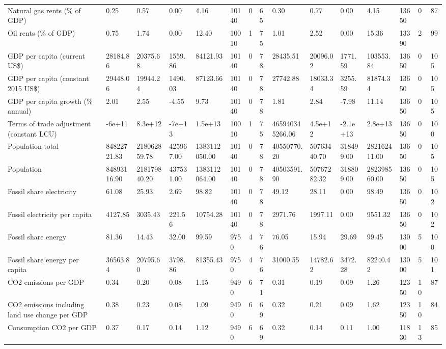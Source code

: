 \begin{longtable}{lllllllllllllll}
\addlinespace
Natural gas rents (\% of GDP) & 0.25 & 0.57 & 0.00 & 4.16 & 10140 & 0 & 65 & 0.30 & 0.77 & 0.00 & 4.15 & 13650 & 0 & 87\\
Oil rents (\% of GDP) & 0.75 & 1.74 & 0.00 & 12.40 & 10010 & 1 & 75 & 1.01 & 2.52 & 0.00 & 15.36 & 13390 & 2 & 99\\
GDP per capita (current US\$) & 28184.86 & 20375.68 & 1559.86 & 84121.93 & 10140 & 0 & 78 & 28435.51 & 20096.02 & 1771.59 & 103553.84 & 13650 & 0 & 105\\
GDP per capita (constant 2015 US\$) & 29448.06 & 19944.24 & 1490.03 & 87123.66 & 10140 & 0 & 78 & 27742.88 & 18033.34 & 3255.59 & 81874.34 & 13650 & 0 & 105\\
GDP per capita growth (\% annual) & 2.01 & 2.55 & -4.55 & 9.73 & 10140 & 0 & 78 & 1.81 & 2.84 & -7.98 & 11.14 & 13650 & 0 & 105\\
\addlinespace
Terms of trade adjustment (constant LCU) & -6e+11 & 8.3e+12 & -7e+13 & 1.5e+13 & 10010 & 1 & 75 & 465940345266.06 & 4.5e+12 & -2.1e+13 & 2.8e+13 & 13650 & 0 & 100\\
Population total & 84822721.83 & 218062859.78 & 425967.00 & 1383112050.00 & 10140 & 0 & 78 & 40550770.20 & 50763440.70 & 318499.00 & 282162411.00 & 13650 & 0 & 105\\
Population & 84893116.90 & 218179840.20 & 437531.00 & 1383112064.00 & 10140 & 0 & 78 & 40503591.90 & 50767282.32 & 318809.00 & 282398560.00 & 13650 & 0 & 105\\
Fossil share electricity & 61.08 & 25.93 & 2.69 & 98.82 & 10140 & 0 & 78 & 49.12 & 28.11 & 0.00 & 98.49 & 13650 & 0 & 102\\
Fossil electricity per capita & 4127.85 & 3035.43 & 221.56 & 10754.28 & 10140 & 0 & 78 & 2971.76 & 1997.11 & 0.00 & 9551.32 & 13650 & 0 & 102\\
\addlinespace
Fossil share energy & 81.36 & 14.43 & 32.00 & 99.59 & 9750 & 4 & 76 & 76.05 & 15.94 & 29.69 & 99.45 & 13000 & 5 & 100\\
Fossil share energy per capita & 36563.84 & 20795.60 & 3798.86 & 81355.43 & 9750 & 4 & 76 & 31000.55 & 14782.62 & 3472.28 & 82240.42 & 13000 & 5 & 101\\
CO2 emissions per GDP & 0.34 & 0.20 & 0.08 & 1.15 & 9490 & 6 & 71 & 0.31 & 0.19 & 0.09 & 1.26 & 12350 & 10 & 87\\
CO2 emissions including land use change per GDP & 0.38 & 0.23 & 0.08 & 1.09 & 9490 & 6 & 69 & 0.32 & 0.21 & 0.09 & 1.62 & 12350 & 10 & 84\\
Consumption CO2 per GDP & 0.37 & 0.17 & 0.14 & 1.12 & 9490 & 6 & 69 & 0.32 & 0.14 & 0.11 & 1.00 & 11830 & 13 & 85\\

\end{longtable}
